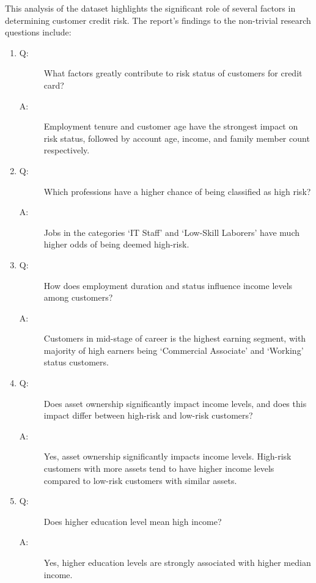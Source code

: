 \documentclass{article}\usepackage[]{graphicx}\usepackage[]{xcolor}
\begin{document}
This analysis of the dataset highlights the significant role of several factors in determining customer credit risk. The report's findings to the non-trivial research questions include:\\

\begin{enumerate}

\item \begin{description}
\item[Q:] What factors greatly contribute to risk status of customers for credit card? 
\item[A:] Employment tenure and customer age have the strongest impact on risk status, followed by account age, income, and family member count respectively.\\
\end{description}

\item \begin{description}
\item[Q:] Which professions have a higher chance of being classified as high risk? 
\item[A:] Jobs in the categories `IT Staff' and `Low-Skill Laborers' have much higher odds of being deemed high-risk.\\
\end{description}

\item \begin{description}
\item[Q:] How does employment duration and status influence income levels among customers? 
\item[A:] Customers in mid-stage of career is the highest earning segment, with majority of high earners being `Commercial Associate' and `Working' status customers.\\
\end{description}

\item \begin{description}
\item[Q:] Does asset ownership significantly impact income levels, and does this impact differ between high-risk and low-risk customers? 
\item[A:] Yes, asset ownership significantly impacts income levels. High-risk customers with more assets tend to have higher income levels compared to low-risk customers with similar assets.\\
\end{description}

\item \begin{description}
\item[Q:] Does higher education level mean high income? 
\item[A:] Yes, higher education levels are strongly associated with higher median income.\\
\end{description}

\end{enumerate}
\end{document}
